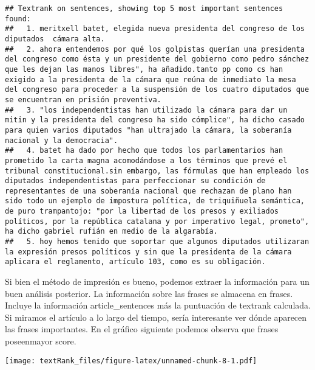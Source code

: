 \documentclass[]{article}
\newenvironment{Shaded}{\begin{snugshade}}{\end{snugshade}}
\newcommand{\KeywordTok}[1]{\textcolor[rgb]{0.13,0.29,0.53}{\textbf{#1}}}
\newcommand{\DataTypeTok}[1]{\textcolor[rgb]{0.13,0.29,0.53}{#1}}
\newcommand{\StringTok}[1]{\textcolor[rgb]{0.31,0.60,0.02}{#1}}
\newcommand{\OperatorTok}[1]{\textcolor[rgb]{0.81,0.36,0.00}{\textbf{#1}}}
\newcommand{\NormalTok}[1]{#1}
\begin{document}
\begin{verbatim}
## Textrank on sentences, showing top 5 most important sentences found:
##   1. meritxell batet, elegida nueva presidenta del congreso de los diputados  cámara alta.
##   2. ahora entendemos por qué los golpistas querían una presidenta del congreso como ésta y un presidente del gobierno como pedro sánchez que les dejan las manos libres", ha añadido.tanto pp como cs han exigido a la presidenta de la cámara que reúna de inmediato la mesa del congreso para proceder a la suspensión de los cuatro diputados que se encuentran en prisión preventiva.
##   3. "los independentistas han utilizado la cámara para dar un mitin y la presidenta del congreso ha sido cómplice", ha dicho casado para quien varios diputados "han ultrajado la cámara, la soberanía nacional y la democracia".
##   4. batet ha dado por hecho que todos los parlamentarios han prometido la carta magna acomodándose a los términos que prevé el tribunal constitucional.sin embargo, las fórmulas que han empleado los diputados independentistas para perfeccionar su condición de representantes de una soberanía nacional que rechazan de plano han sido todo un ejemplo de impostura política, de triquiñuela semántica, de puro trampantojo: "por la libertad de los presos y exiliados políticos, por la república catalana y por imperativo legal, prometo", ha dicho gabriel rufián en medio de la algarabía.
##   5. hoy hemos tenido que soportar que algunos diputados utilizaran la expresión presos políticos y sin que la presidenta de la cámara aplicara el reglamento, artículo 103, como es su obligación.
\end{verbatim}

Si bien el método de impresión es bueno, podemos extraer la información
para un buen análisis posterior. La información sobre las frases se
almacena en frases. Incluye la información article\_sentences más la
puntuación de textrank calculada. Si miramos el artículo a lo largo del
tiempo, sería interesante ver dónde aparecen las frases importantes. En
el gráfico siguiente podemos observa que frases poseenmayor score.

\begin{Shaded}
\end{Shaded}

\texttt{[image: textRank\_files/figure-latex/unnamed-chunk-8-1.pdf]}
\end{document}
